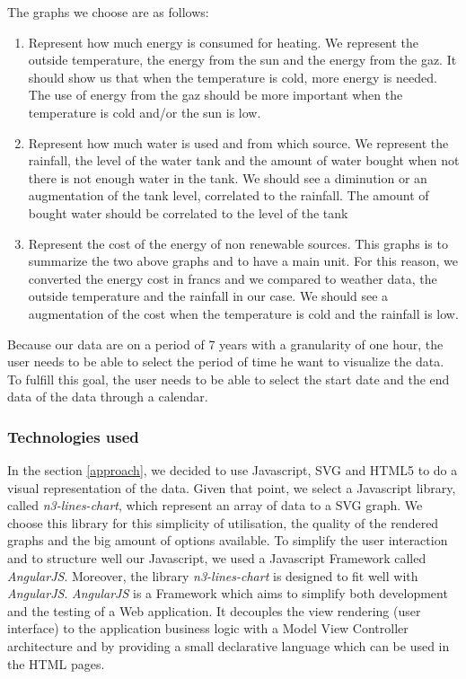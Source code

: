 \documentclass{acm_proc_article-sp}
\begin{document}
The graphs we choose are as follows:
\begin{enumerate}
\item Represent how much energy is consumed for heating. We represent the outside temperature, the energy from the sun and the energy from the gaz. It should show us that when the temperature is cold, more energy is needed. The use of energy from the gaz should be more important when the temperature is cold and/or the sun is low.
\item Represent how much water is used and from which source. We represent the rainfall, the level of the water tank and the amount of water bought when not there is not enough water in the tank. We should see a diminution or an augmentation of the tank level, correlated to the rainfall. The amount of bought water should be correlated to the level of the tank 
\item Represent the cost of the energy of non renewable sources. This graphs is to summarize the two above graphs and to have a main unit. For this reason, we converted the energy cost in francs and we compared to weather data, the outside temperature and the rainfall in our case. We should see a augmentation of the cost when the temperature is cold and the rainfall is low.
\end{enumerate}

Because our data are on a period of 7 years with a granularity of one hour, the user needs to be able to select the period of time he want to visualize the data. To fulfill this goal, the user needs to be able to select the start date and the end data of the data through a calendar.

\subsubsection{Technologies used}
In the section \ref{approach}, we decided to use Javascript, SVG and HTML5 to do a visual representation of the data. Given that point, we select a Javascript library, called \emph{n3-lines-chart}\cite{n3}, which represent an array of data to a SVG graph. We choose this library for this simplicity of utilisation, the quality of the rendered graphs and the big amount of options available. To simplify the user interaction and to structure well our Javascript, we used a Javascript Framework called \emph{AngularJS}\cite{angular}. Moreover, the library \emph{n3-lines-chart} is designed to fit well with \emph{AngularJS}. \emph{AngularJS} is a Framework which aims to simplify both development and the testing of a Web application. It decouples the view rendering (user interface) to the application business logic with a Model View Controller architecture and by providing a small declarative language which can be used in the HTML pages.
\end{document}
